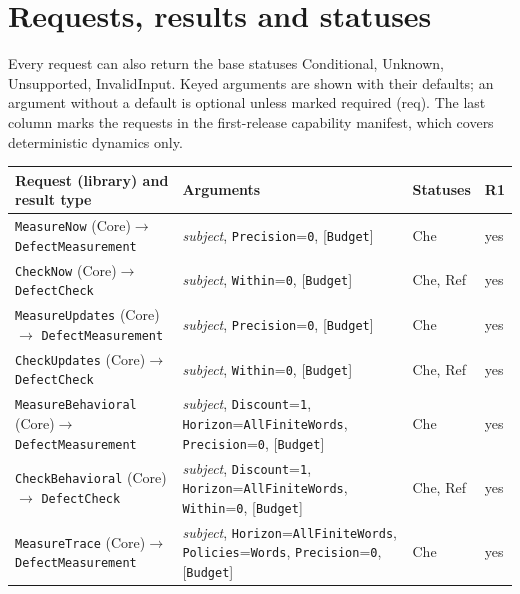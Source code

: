 \documentclass[11pt]{article}
\newcommand{\code}[1]{\texttt{#1}}
\theoremstyle{definition}
\theoremstyle{plain}
\begin{document}
\section{Requests, results and statuses}\label{app:schemas}
Every request can also return the base statuses Conditional, Unknown, Unsupported, InvalidInput. Keyed arguments are shown with their defaults; an argument without a default is optional unless marked required (req). The last column marks the requests in the first-release capability manifest, which covers deterministic dynamics only.
{\scriptsize\begin{longtable}{>{\raggedright\arraybackslash}p{4.4cm}>{\raggedright\arraybackslash}p{6.8cm}>{\raggedright\arraybackslash}p{1.9cm}>{\raggedright\arraybackslash}p{0.5cm}}
\toprule Request (library) and result type & Arguments & Statuses & R1\\ \midrule \endhead
\code{MeasureNow} (Core)\newline$\to$ \code{DefectMeasurement} & \emph{subject}, \code{Precision}=\code{0}, [\code{Budget}] & Che & yes\\
\code{CheckNow} (Core)\newline$\to$ \code{DefectCheck} & \emph{subject}, \code{Within}=\code{0}, [\code{Budget}] & Che, Ref & yes\\
\code{MeasureUpdates} (Core)\newline$\to$ \code{DefectMeasurement} & \emph{subject}, \code{Precision}=\code{0}, [\code{Budget}] & Che & yes\\
\code{CheckUpdates} (Core)\newline$\to$ \code{DefectCheck} & \emph{subject}, \code{Within}=\code{0}, [\code{Budget}] & Che, Ref & yes\\
\code{MeasureBehavioral} (Core)\newline$\to$ \code{DefectMeasurement} & \emph{subject}, \code{Discount}=\code{1}, \code{Horizon}=\code{AllFiniteWords}, \code{Precision}=\code{0}, [\code{Budget}] & Che & yes\\
\code{CheckBehavioral} (Core)\newline$\to$ \code{DefectCheck} & \emph{subject}, \code{Discount}=\code{1}, \code{Horizon}=\code{AllFiniteWords}, \code{Within}=\code{0}, [\code{Budget}] & Che, Ref & yes\\
\code{MeasureTrace} (Core)\newline$\to$ \code{DefectMeasurement} & \emph{subject}, \code{Horizon}=\code{AllFiniteWords}, \code{Policies}=\code{Words}, \code{Precision}=\code{0}, [\code{Budget}] & Che & yes\\

\end{longtable}}
\end{document}
